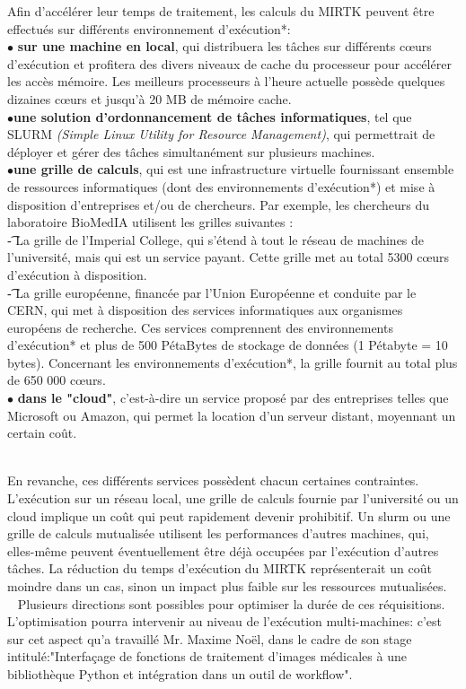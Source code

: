 \documentclass[10pt]{report}
\begin{document}
	Afin d'accélérer leur temps de traitement, les calculs du MIRTK peuvent être effectués sur différents environnement d'exécution*:
	\\{$\bullet$}\textbf{ sur une machine en local}, 
	qui distribuera les tâches sur différents cœurs d'exécution et profitera des divers niveaux de cache du processeur pour accélérer les accès mémoire. Les meilleurs processeurs à l'heure actuelle possède quelques dizaines cœurs et jusqu'à 20 MB de mémoire cache.
	\\{$\bullet$}\textbf{une solution d'ordonnancement de tâches informatiques}, tel que SLURM \textit{(Simple Linux Utility for Resource Management)}, qui permettrait de déployer et gérer des tâches simultanément sur plusieurs machines. 
	\\{$\bullet$}\textbf{une grille de calculs}, qui est une infrastructure virtuelle fournissant ensemble de ressources informatiques (dont des environnements d'exécution*) et mise à disposition d'entreprises et/ou de chercheurs. \newline
	Par exemple, les chercheurs du laboratoire BioMedIA utilisent les grilles suivantes : \\
	\t - La grille de l'Imperial College, qui s'étend à tout le réseau de machines de l'université, mais qui est un service payant. Cette grille met au total 5300 cœurs d'exécution à disposition.\\
	\t - La grille européenne, financée par l'Union Européenne et conduite par le CERN, qui met à disposition des services informatiques aux organismes européens de recherche. Ces services comprennent des environnements d'exécution* et plus de 500 PétaBytes de stockage de données (1 Pétabyte = 10 bytes). Concernant les environnements d'exécution*, la grille fournit au total plus de 650 000 cœurs.
	\\{$\bullet$}\textbf{ dans le "cloud"}, c'est-à-dire un service proposé par des entreprises telles que Microsoft ou Amazon, qui permet la location d'un serveur distant, moyennant un certain coût. \\ ~\par
	En revanche, ces différents services possèdent chacun certaines contraintes. L'exécution sur un réseau local, une grille de calculs fournie par l'université ou un cloud implique un coût qui peut rapidement devenir prohibitif. Un slurm ou une grille de calculs mutualisée utilisent les performances d'autres machines, qui, elles-même peuvent éventuellement être déjà occupées par l'exécution d'autres tâches. La réduction du temps d'exécution du MIRTK représenterait un coût moindre dans un cas, sinon un impact plus faible sur les ressources mutualisées.\\ 
	Plusieurs directions sont possibles pour optimiser la durée de ces réquisitions. L'optimisation pourra intervenir au niveau de l'exécution multi-machines: c'est sur cet aspect qu'a travaillé Mr. Maxime Noël, dans le cadre de son stage intitulé:"Interfaçage de fonctions de traitement d'images médicales à une bibliothèque Python et intégration dans un outil de workflow".\\
	\vspace{-0.7cm}
\end{document}

